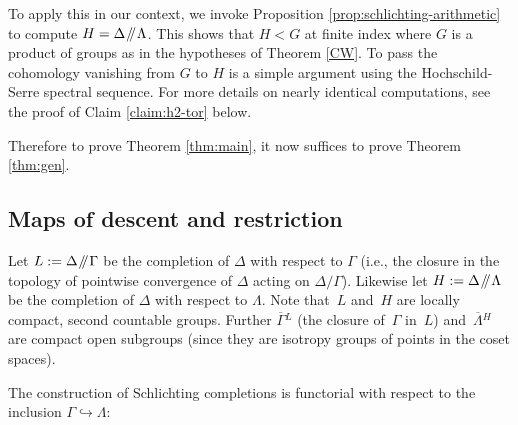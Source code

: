 \documentclass[11pt]{article}
\newcommand{\ie}{i.e.,\xspace}
\numberwithin{equation}{section}\providecommand{\llangle}{\langle\!\langle}\providecommand{\rrangle}{\rangle\!\rangle}\providecommand{\Asterisk}{\ast}
\newcommand{\oGL}{\ensuremath{\overline{\Gamma}{}^L}}
\newcommand{\oLH}{\ensuremath{\overline{\Lambda}{}^H}}
\newcommand{\sslash}{\mathbin{\mkern-3mu /\mkern-5mu/ \mkern-3mu}}
\theoremstyle{definition}
\begin{document}
To apply this in our context, we invoke Proposition \ref{prop:schlichting-arithmetic} to compute
$H=\Delta \sslash \Lambda$. This shows that $H<G$ at finite index where $G$ is a product of groups
as in the hypotheses of Theorem \ref{CW}. To pass the cohomology vanishing from $G$ to $H$ is a simple argument using the Hochschild-Serre spectral sequence. For more details on nearly identical computations, see the proof of Claim \ref{claim:h2-tor} below.

Therefore to prove Theorem \ref{thm:main}, it now suffices to prove Theorem \ref{thm:gen}.

\subsection{Maps of descent and restriction} \label{sec:restrict}
Let $L:=\Delta \sslash \Gamma$ be the completion of $\Delta$ with respect to $\Gamma$ (\ie the closure in the topology of pointwise convergence of $\Delta$ acting on $\Delta / \Gamma$). Likewise let $H:=\Delta\sslash\Lambda$ be the completion of $\Delta$ with respect to $\Lambda$. Note that~$L$ and~$H$ are locally compact, second countable groups. Further $\oGL$ (the closure of~$\Gamma$ in~$L$) and~$\oLH$ are compact open subgroups (since they are isotropy groups of points in the coset spaces).

The construction of Schlichting completions is functorial with respect to the inclusion $\Gamma\hookrightarrow \Lambda$:
\end{document}
